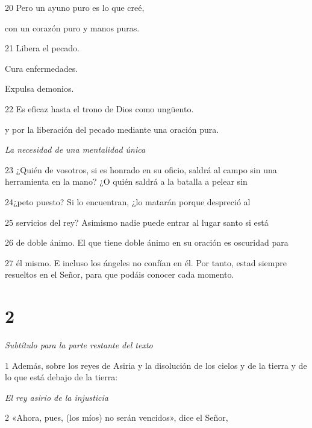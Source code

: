 \par 20 Pero un ayuno puro es lo que creé,

\par con un corazón puro y manos puras.

\par 21 Libera el pecado.

\par Cura enfermedades.

\par Expulsa demonios.

\par 22 Es eficaz hasta el trono de Dios como ungüento.

\par y por la liberación del pecado mediante una oración pura.

\par \textit{La necesidad de una mentalidad única}

\par 23 ¿Quién de vosotros, si es honrado en su oficio, saldrá al campo sin una herramienta en la mano? ¿O quién saldrá a la batalla a pelear sin

\par 24¿peto puesto? Si lo encuentran, ¿lo matarán porque despreció al

\par 25 servicios del rey? Asimismo nadie puede entrar al lugar santo si está

\par 26 de doble ánimo. El que tiene doble ánimo en su oración es oscuridad para

\par 27 él mismo. E incluso los ángeles no confían en él. Por tanto, estad siempre resueltos en el Señor, para que podáis conocer cada momento.

\chapter{2}

\par \textit{Subtítulo para la parte restante del texto}

\par 1 Además, sobre los reyes de Asiria y la disolución de los cielos y de la tierra y de lo que está debajo de la tierra:

\par \textit{El rey asirio de la injusticia}

\par 2 «Ahora, pues, (los míos) no serán vencidos», dice el Señor,

